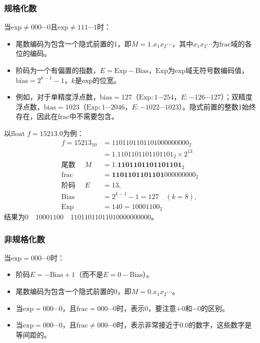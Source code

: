 \documentclass[a4paper, 12pt, UTF8]{ctexart}
\begin{document}
\subsubsection{规格化数}
当\(\text{exp}\neq000\cdots0\)且\(\text{exp}\neq111\cdots1\)时：
\begin{itemize}
    \item 尾数编码为包含一个隐式前置的1，即\(M = 1.x_1 x_2{\cdots}\)，其中\(x_1x_2\cdots\)为\(\text{frac}\)域的各位的编码。
    \item 阶码为一个有偏置的指数，\(E=\text{Exp}-\text{Bias}\)，\(\text{Exp}\)为\(\text{exp}\)域无符号数编码值，\(\text{bias}=2^{k - 1}-1\)，\(k\)是\(\text{exp}\)的位宽。
    \item 例如，对于单精度浮点数，\(\text{bias}=127\)（\(\text{Exp}:1\cdots254\)，\(E:-126\cdots127\)）；双精度浮点数，\(\text{bias}=1023\)（\(\text{Exp}:1\cdots2046\)，\(E:-1022\cdots1023\)）。隐式前置的整数1始终存在，因此在\(\text{frac}\)中不需要包含。
\end{itemize}
以\(\text{float }f = 15213.0\)为例：
\begin{align*}
    f=15213_{10}      & =1101101101101000000000_{2}           \\
                      & =1.1101101101101101_{2}\times2^{13}   \\
    \text{尾数 }\quad M & =1.\textbf{1101101101101101}_{2}      \\
    \text{frac}       & =\textbf{1101101101101} 000000000_{2} \\
    \text{阶码 }\quad E & =13,                                  \\
    \text{Bias}       & =2^{k-1}-1=127\quad(k=8),             \\
    \text{Exp}        & =140 = 10001100_{2}
\end{align*}
结果为\(0\quad10001100  \quad11011011011010000000000\)。

\subsubsection{非规格化数}
当\(\text{exp}=000\cdots0\)时：
\begin{itemize}
    \item 阶码\(E=-\text{Bias}+1\)（而不是\(E = 0-\text{Bias}\)）。
    \item 尾数编码为包含一个隐式前置的0，即\(M = 0.x_1x_2\cdots\)。
    \item 当\(\text{exp}=000\cdots0\)，且\(\text{frac}=000\cdots0\)时，表示0，要注意\(+0\)和\(-0\)的区别。
    \item 当\(\text{exp}=000\cdots0\)，且\(\text{frac}\neq000\cdots0\)时，表示非常接近于0.0的数字，这些数字是等间距的。
\end{itemize}
\end{document}
